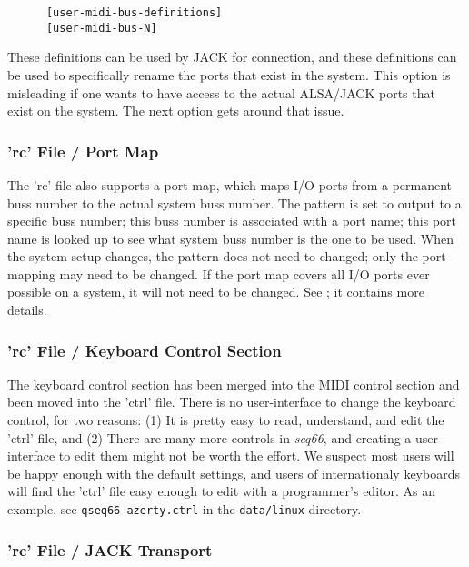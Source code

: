    \begin{verbatim}
      [user-midi-bus-definitions]
      [user-midi-bus-N]
   \end{verbatim}

   These definitions can be used by JACK for connection, and these
   definitions can be used to specifically rename the ports that exist in the
   system.
   This option is misleading if one wants to have access to the
   actual ALSA/JACK ports that exist on the system.
   The next option gets around that issue.

\subsubsection{'rc' File / Port Map}
\label{subsubsec:configuration_rc_port_map}

   The 'rc' file also supports a port map, which maps I/O ports from a
   permanent buss number to the actual system buss number.
   The pattern is set to output to a specific buss number; this buss number is
   associated with a port name; this port name is looked up to see what
   system buss number is the one to be used.  When the system setup changes,
   the pattern does not need to changed; only the port mapping may need to be
   changed.  If the port map covers all I/O ports ever possible on a system, it
   will not need to be changed.  See ; it contains
   more details.

\subsubsection{'rc' File / Keyboard Control Section}
\label{subsubsec:configuration_rc_keyboard_control}

   The keyboard control section has been merged into the MIDI control section
   and been moved into the 'ctrl' file.
   There is no user-interface to change the
   keyboard control, for two reasons:
   (1) It is pretty easy to read, understand, and edit the 'ctrl' file, and
   (2) There are many more controls in \textsl{seq66}, and creating a
   user-interface to edit them might not be worth the effort.
   We suspect most users will be happy enough with the default settings,
   and users of internationaly keyboards will find the 'ctrl' file easy enough
   to edit with a programmer's editor.  As an example,
   see \texttt{qseq66-azerty.ctrl} in the \texttt{data/linux}
   directory.
        
\subsubsection{'rc' File / JACK Transport}
\label{subsubsec:configuration_rc_jack_transport}

